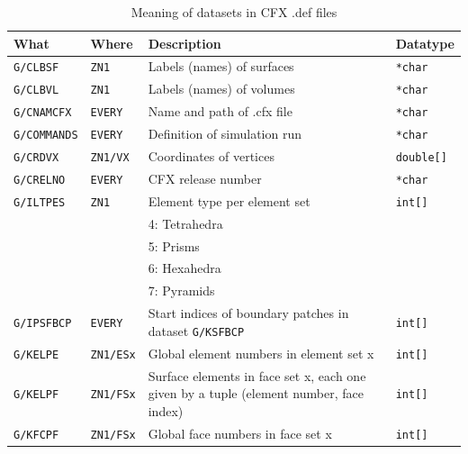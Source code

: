 \documentclass[a4paper,10pt]{article}
\begin{document}
\begin{table}
  \centering
  \caption{Meaning of datasets in CFX .def files}
  \label{tab:cfx_def}
  \begin{tabular}{llp{9cm}l}
    \textbf{What} & \textbf{Where} & \textbf{Description} & \textbf{Datatype} \\
    \hline\hline
    \texttt{G/CLBSF}    & \texttt{ZN1}     & Labels (names) of surfaces                    & \texttt{*char} \\ \hline
    \texttt{G/CLBVL}    & \texttt{ZN1}     & Labels (names) of volumes                     & \texttt{*char} \\ \hline
    \texttt{G/CNAMCFX}  & \texttt{EVERY}   & Name and path of .cfx file                    & \texttt{*char} \\ \hline
    \texttt{G/COMMANDS} & \texttt{EVERY}   & Definition of simulation run                  & \texttt{*char} \\ \hline
    \texttt{G/CRDVX}    & \texttt{ZN1/VX}  & Coordinates of vertices                       & \texttt{double[]} \\ \hline
    \texttt{G/CRELNO}   & \texttt{EVERY}   & CFX release number                            & \texttt{*char} \\ \hline
    \texttt{G/ILTPES}   & \texttt{ZN1}     & Element type per element set                  & \texttt{int[]} \\
                         &                   & 4: Tetrahedra & \\                                      
                         &                   & 5: Prisms     & \\                                      
                         &                   & 6: Hexahedra  & \\                                      
                         &                   & 7: Pyramids   & \\ \hline
    \texttt{G/IPSFBCP}  & \texttt{EVERY}   & Start indices of boundary patches in dataset \texttt{G/KSFBCP} & \texttt{int[]} \\ \hline
    \texttt{G/KELPE}    & \texttt{ZN1/ESx} & Global element numbers in element set x       & \texttt{int[]} \\ \hline
    \texttt{G/KELPF}    & \texttt{ZN1/FSx} & Surface elements in face set x, each one given by a tuple (element number, face index) & \texttt{int[]} \\ \hline          
    \texttt{G/KFCPF}    & \texttt{ZN1/FSx} & Global face numbers in face set x             & \texttt{int[]} \\ \hline

\end{tabular}
\end{table}
\end{document}
